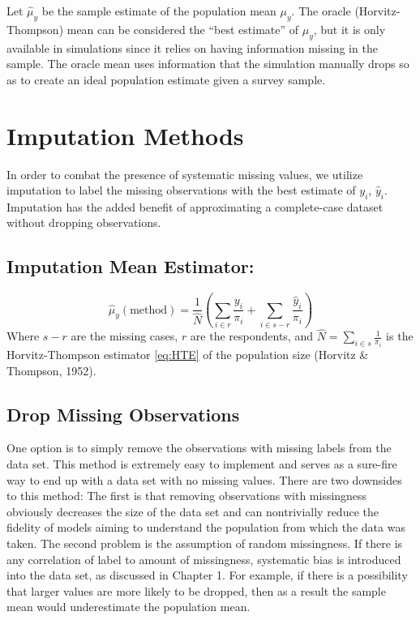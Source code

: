 \documentclass[12pt,twoside]{reedthesis}
\begin{document}
Let \(\hat \mu_y\) be the sample estimate of the population mean
\(\mu_y\). The oracle (Horvitz-Thompson) mean can be considered the
``best estimate'' of \(\mu_y\), but it is only available in simulations
since it relies on having information missing in the sample. The oracle
mean uses information that the simulation manually drops so as to create
an ideal population estimate given a survey sample.

\section{Imputation Methods}\label{imputation-methods}

In order to combat the presence of systematic missing values, we utilize
imputation to label the missing observations with the best estimate of
\(y_i\), \(\hat y_i\). Imputation has the added benefit of approximating
a complete-case dataset without dropping observations.

\subsection{Imputation Mean Estimator:}\label{imputation-mean-estimator}

\[
\hat \mu_y(\text{method}) = \frac{1}{\hat N} (\sum_{i \in r} \frac{y_i}{\pi_i} + \sum_{i \in s-r} \frac{\hat y_i}{\pi_i})
\] Where \(s-r\) are the missing cases, \(r\) are the respondents, and
\(\hat N = \sum_{i \in s} \frac{1}{\pi_i}\) is the Horvitz-Thompson
estimator \eqref{eq:HTE} of the population size (Horvitz \& Thompson,
1952).

\subsection{Drop Missing Observations}\label{drop-missing-observations}

One option is to simply remove the observations with missing labels from
the data set. This method is extremely easy to implement and serves as a
sure-fire way to end up with a data set with no missing values. There
are two downsides to this method: The first is that removing
observations with missingness obviously decreases the size of the data
set and can nontrivially reduce the fidelity of models aiming to
understand the population from which the data was taken. The second
problem is the assumption of random missingness. If there is any
correlation of label to amount of missingness, systematic bias is
introduced into the data set, as discussed in Chapter 1. For example, if
there is a possibility that larger values are more likely to be dropped,
then as a result the sample mean would underestimate the population
mean.
\end{document}
